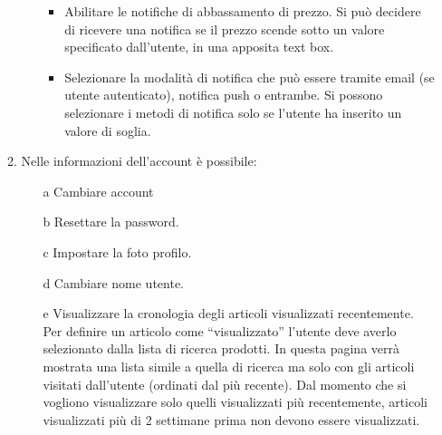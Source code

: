 \documentclass{article}
\begin{document}
\begin{itemize}
\begin{enumerate}
\begin{itemize}
                    \begin{itemize}
                        \item Abilitare le notifiche di abbassamento di prezzo. Si può decidere di ricevere una notifica se il prezzo
                                scende sotto un valore specificato dall’utente, in una apposita text box.
                        \item Selezionare la modalità di notifica che può essere tramite email (se utente autenticato), notifica push o entrambe.
                                Si possono selezionare i metodi di notifica solo se l'utente ha inserito un valore di soglia.
                    \end{itemize}
                \end{itemize}
                \item Nelle informazioni dell’account è possibile:
                \begin{itemize}
                    \item [a] Cambiare account
                    \item [b] Resettare la password.
                    \item [c] Impostare la foto profilo.
                    \item [d] Cambiare nome utente.
                    \item [e] Visualizzare la cronologia degli articoli visualizzati recentemente. Per definire un articolo come “visualizzato”
                    l’utente deve averlo selezionato dalla lista di ricerca prodotti. In questa pagina verrà mostrata una lista simile a quella
                    di ricerca ma solo con gli articoli visitati dall’utente (ordinati dal più recente). Dal momento che si vogliono visualizzare
                    solo quelli visualizzati più recentemente, articoli visualizzati più di 2 settimane prima non devono essere visualizzati.
                \end{itemize}
            \end{enumerate}
    \end{itemize}
\end{document}
